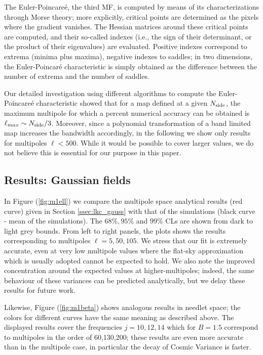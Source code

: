 \documentclass[aps,prd,showpacs,superscriptaddress,groupedaddress]{revtex4-1}  %
\newcommand{\figref}[1]{Figure (\ref{#1})}
\newcommand{\secref}[1]{Section \ref{#1}}
\begin{document}
The Euler-Poincare\'{e}, the third MF, is computed by means of its
characterizations through Morse theory; more explicitly, critical
points are determined as the pixels where the gradient vanishes.
The Hessian matrices around these critical points are computed,
and their so-called indexes (i.e., the sign of their determinant,
or the product of their eigenvalues) are evaluated. Positive
indexes correspond to extrema (minima plus maxima), negative
indexes to saddles; in two dimensions, the Euler-Poincar\'{e}
characteristic is simply obtained as the difference between the
number of extrema and the number of saddles. 

Our detailed investigation using different algorithms to compute the
Euler-Poincare\'{e} characteristic showed that for a map defined at a
given $N_{\rm side}$, the maximum multipole for which a percent
numerical accuracy can be obtained is $\ell_{max} \sim N_{\rm
  side}/3$. Moreover, since a polynomial transformation of a band
limited map increases the bandwidth accordingly, in the following we
show only results for multipoles $\ell<500$. While it would be
possible to cover larger values, we do not believe this is
essential for our purpose in this paper.




\subsection*{Results: Gaussian fields}

In \figref{fig:m1ell} we compare the multipole space analytical
results (red curve) given in \secref{ssec:lkc_gauss} with that of
the simulations (black curve - mean of the simulations). The
$68\%,95\%$ and $99\%$ CLs are shown from dark to light grey
bounds. From left to right panels, the plots shows the results
corresponding to multipoles $\ell=5,50,105$. We stress that our
fit is extremely accurate, even at very low multipole values where
the flat-sky approximation which is usually adopted cannot be
expected to hold.  We also note the improved concentration around
the expected values at higher-multipoles; indeed, the same
behaviour of these variances can be predicted analytically, but we
delay these results for future work.

Likewise, \figref{fig:m1beta} shows analogous results in needlet
space; the colors for different curves have the same meaning as
described above. The displayed results cover the frequencies
$j=10,12,14$  which for $B=1.5$  correspond to multipoles in the order of
60,130,200; these results are even more accurate than in the
multipole case, in particular the decay of Cosmic Variance is
faster.
\end{document}
